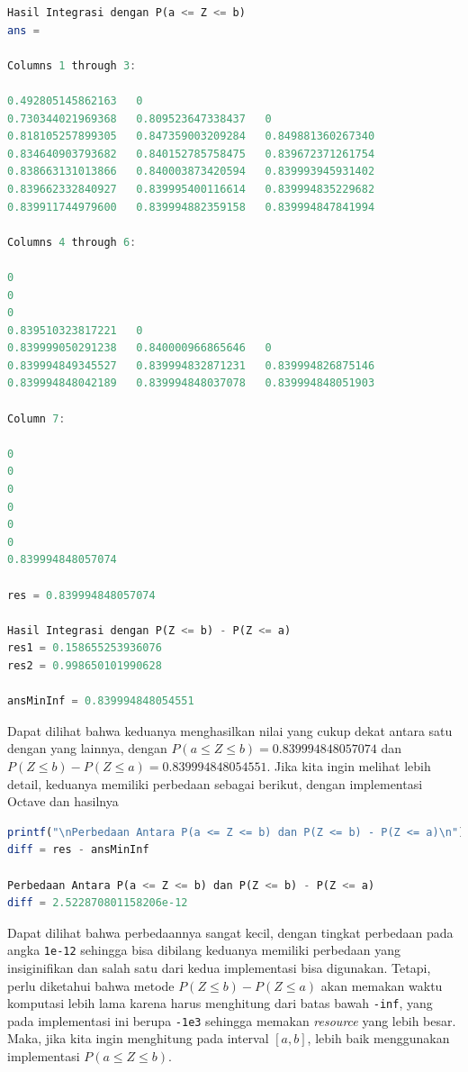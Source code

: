\documentclass[journal,12pt,onecolumn,a4paper]{IEEEtran}
\begin{document}
\begin{center}
	\begin{lstlisting}[language=Octave]
Hasil Integrasi dengan P(a <= Z <= b)
ans =

Columns 1 through 3:

0.492805145862163   0                   
0.730344021969368   0.809523647338437   0
0.818105257899305   0.847359003209284   0.849881360267340
0.834640903793682   0.840152785758475   0.839672371261754
0.838663131013866   0.840003873420594   0.839993945931402
0.839662332840927   0.839995400116614   0.839994835229682
0.839911744979600   0.839994882359158   0.839994847841994

Columns 4 through 6:

0
0
0 
0.839510323817221	0
0.839999050291238	0.840000966865646	0
0.839994849345527	0.839994832871231	0.839994826875146
0.839994848042189	0.839994848037078	0.839994848051903

Column 7:

0
0
0
0
0
0
0.839994848057074

res = 0.839994848057074

Hasil Integrasi dengan P(Z <= b) - P(Z <= a)
res1 = 0.158655253936076
res2 = 0.998650101990628

ansMinInf = 0.839994848054551
	\end{lstlisting}
\end{center}

Dapat dilihat bahwa keduanya menghasilkan nilai yang cukup dekat antara satu dengan yang lainnya, dengan \(P(a \le Z \le b)= 0.839994848057074\)  dan \(P(Z \le b ) - P(Z \le a ) = 0.839994848054551\). Jika kita ingin melihat lebih detail, keduanya memiliki perbedaan sebagai berikut, dengan implementasi Octave dan hasilnya

\begin{center}
	\begin{lstlisting}[language=Octave]
printf("\nPerbedaan Antara P(a <= Z <= b) dan P(Z <= b) - P(Z <= a)\n")
diff = res - ansMinInf

Perbedaan Antara P(a <= Z <= b) dan P(Z <= b) - P(Z <= a)
diff = 2.522870801158206e-12
	\end{lstlisting}
\end{center}

Dapat dilihat bahwa perbedaannya sangat kecil, dengan tingkat perbedaan pada angka \lstinline{1e-12} sehingga bisa dibilang keduanya memiliki perbedaan yang insiginifikan dan salah satu dari kedua implementasi bisa digunakan. Tetapi, perlu diketahui bahwa metode \(P(Z \le b ) - P(Z \le a )\) akan memakan waktu komputasi lebih lama karena harus menghitung dari batas bawah \lstinline{-inf}, yang pada implementasi ini berupa \lstinline{-1e3} sehingga memakan \emph{resource} yang lebih besar. Maka, jika kita ingin menghitung pada interval \([a,b]\), lebih baik menggunakan implementasi \(P(a \le Z \le b)\).
\end{document}
